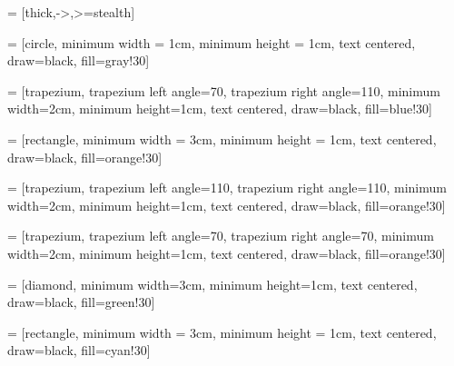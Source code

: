  = [thick,->,>=stealth]

 = [circle, minimum width = 1cm, minimum height = 1cm, text centered,  draw=black, fill=gray!30]

 = [trapezium, trapezium left angle=70, trapezium right angle=110, minimum width=2cm, minimum height=1cm, text centered, draw=black, fill=blue!30]

 = [rectangle, minimum width = 3cm, minimum height = 1cm, text centered, draw=black, fill=orange!30]

 = [trapezium, trapezium left angle=110, trapezium right angle=110, minimum width=2cm, minimum height=1cm, text centered, draw=black, fill=orange!30]

 = [trapezium, trapezium left angle=70, trapezium right angle=70, minimum width=2cm, minimum height=1cm, text centered, draw=black, fill=orange!30]

 = [diamond, minimum width=3cm, minimum height=1cm, text centered, draw=black, fill=green!30]

 = [rectangle, minimum width = 3cm, minimum height = 1cm, text centered, draw=black, fill=cyan!30]